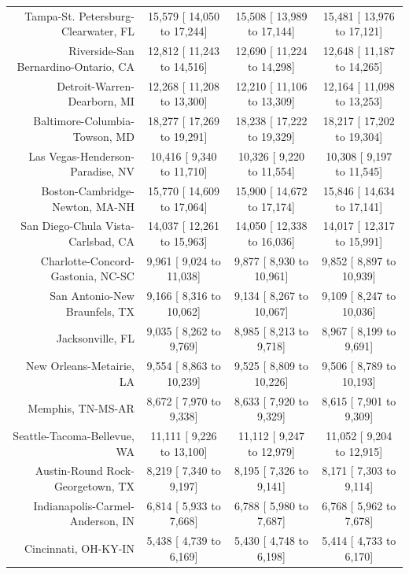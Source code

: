 \documentclass{article}
\begin{document}
\begin{table}[H]
\begin{tabular}{|r|c|c|c|}
		Tampa-St. Petersburg-Clearwater, FL &  15,579 [ 14,050 to  17,244] &  15,508 [ 13,989 to  17,144] &  15,481 [ 13,976 to  17,121]\\
		Riverside-San Bernardino-Ontario, CA &  12,812 [ 11,243 to  14,516] &  12,690 [ 11,224 to  14,298] &  12,648 [ 11,187 to  14,265]\\
		Detroit-Warren-Dearborn, MI &  12,268 [ 11,208 to  13,300] &  12,210 [ 11,106 to  13,309] &  12,164 [ 11,098 to  13,253]\\
		Baltimore-Columbia-Towson, MD &  18,277 [ 17,269 to  19,291] &  18,238 [ 17,222 to  19,329] &  18,217 [ 17,202 to  19,304]\\
		Las Vegas-Henderson-Paradise, NV &  10,416 [  9,340 to  11,710] &  10,326 [  9,220 to  11,554] &  10,308 [  9,197 to  11,545]\\
		Boston-Cambridge-Newton, MA-NH &  15,770 [ 14,609 to  17,064] &  15,900 [ 14,672 to  17,174] &  15,846 [ 14,634 to  17,141]\\
		San Diego-Chula Vista-Carlsbad, CA &  14,037 [ 12,261 to  15,963] &  14,050 [ 12,338 to  16,036] &  14,017 [ 12,317 to  15,991]\\
		Charlotte-Concord-Gastonia, NC-SC &   9,961 [  9,024 to  11,038] &   9,877 [  8,930 to  10,961] &   9,852 [  8,897 to  10,939]\\
		San Antonio-New Braunfels, TX &   9,166 [  8,316 to  10,062] &   9,134 [  8,267 to  10,067] &   9,109 [  8,247 to  10,036]\\
		Jacksonville, FL &   9,035 [  8,262 to   9,769] &   8,985 [  8,213 to   9,718] &   8,967 [  8,199 to   9,691]\\
		New Orleans-Metairie, LA &   9,554 [  8,863 to  10,239] &   9,525 [  8,809 to  10,226] &   9,506 [  8,789 to  10,193]\\
		Memphis, TN-MS-AR &   8,672 [  7,970 to   9,338] &   8,633 [  7,920 to   9,329] &   8,615 [  7,901 to   9,309]\\
		Seattle-Tacoma-Bellevue, WA &  11,111 [  9,226 to  13,100] &  11,112 [  9,247 to  12,979] &  11,052 [  9,204 to  12,915]\\
		Austin-Round Rock-Georgetown, TX &   8,219 [  7,340 to   9,197] &   8,195 [  7,326 to   9,141] &   8,171 [  7,303 to   9,114]\\
		Indianapolis-Carmel-Anderson, IN &   6,814 [  5,933 to   7,668] &   6,788 [  5,980 to   7,687] &   6,768 [  5,962 to   7,678]\\
		Cincinnati, OH-KY-IN &   5,438 [  4,739 to   6,169] &   5,430 [  4,748 to   6,198] &   5,414 [  4,733 to   6,170]\\

\end{tabular}
\end{table}
\end{document}
